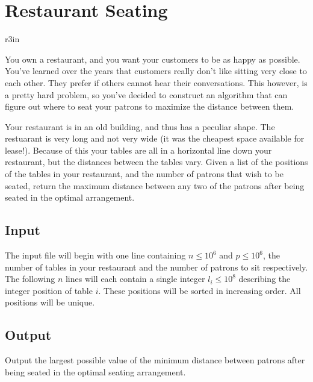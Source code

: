 \documentclass[11pt]{article}
\begin{document}
\section*{Restaurant Seating}


\begin{wrapfigure}{r}{3in}
\vspace{-10pt}
\vspace{-30pt}
\end{wrapfigure}

You own a restaurant, and you want your customers to be as happy as possible. You've learned over the years that customers really don't like sitting very close to each other. They prefer if others cannot hear their conversations. This however, is a pretty hard problem, so you've decided to construct an algorithm that can figure out where to seat your patrons to maximize the distance between them.

Your restaurant is in an old building, and thus has a peculiar shape. The restuarant is very long and not very wide (it was the cheapest space available for lease!). Because of this your tables are all in a horizontal line down your restaurant, but the distances between the tables vary. Given a list of the positions of the tables in your restaurant, and the number of patrons that wish to be seated, return the maximum distance between any two of the patrons after being seated in the optimal arrangement.

\subsection*{Input}
The input file will begin with one line containing $n \leq 10^6$ and $p \leq 10^6$, the number of tables in your restaurant and the number of patrons to sit respectively. The following $n$ lines will each contain a single integer $l_i \leq 10^8$ describing the integer position of table $i$. These positions will be sorted in increasing order. All positions will be unique.

\subsection*{Output}
Output the largest possible value of the minimum distance between patrons after being seated in the optimal seating arrangement.
\end{document}
